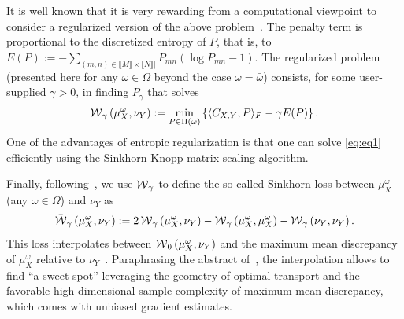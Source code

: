 It is well known  that it is very rewarding from  a computational viewpoint to
consider a  regularized version of the  above problem~\cite[Chapter~4]{COT19}.
The penalty term  is proportional to the discretized entropy  of $P$, that is,
to
$E(P)  :=   -  \sum_{(m,n)   \in  \llbracket  M\rrbracket   \times  \llbracket
  N\rrbracket]} P_{mn} (\log P_{mn}  -1)$.  The regularized problem (presented
here for  any $\omega  \in \Omega$  beyond the  case $\omega  = \bar{\omega}$)
consists, for  some user-supplied $\gamma  > 0$, in finding  $P_{\gamma}$ that
solves
\begin{equation}
  \label{eq:eq1}
  \operatorname{\mathcal{W}}_{\gamma}\left(\mu_X^{\omega}, \nu_Y \right) := \min_{P \in \Pi(\omega)}
  \left\{\langle C_{X,Y}, P \rangle_F - \gamma E(P)\right\}.  
\end{equation}
One  of the  advantages  of  entropic regularization  is  that  one can  solve
\eqref{eq:eq1} efficiently using the Sinkhorn-Knopp matrix scaling algorithm.

Finally, following~\cite{Genevay18}, we use  $\operatorname{\mathcal{W}}_{\gamma}$ to define the so
called Sinkhorn loss between $\mu_{X}^{\omega}$  (any $\omega \in \Omega$) and
$\nu_{Y}$ as
\begin{equation*}
  \bar{\operatorname{\mathcal{W}}}_{\gamma}\left(\mu_X^{\omega},        \nu_Y       \right)        :=       2
  \operatorname{\mathcal{W}}_{\gamma}\left(\mu_X^{\omega},         \nu_Y          \right)         -
  \operatorname{\mathcal{W}}_{\gamma}\left(\mu_X^{\omega},      \mu_X^{\omega}       \right)      -
  \operatorname{\mathcal{W}}_{\gamma}\left(\nu_Y, \nu_Y \right). 
\end{equation*}
This loss interpolates  between $\operatorname{\mathcal{W}}_{0}\left(\mu_X^{\omega}, \nu_Y \right)$
and   the   maximum  mean   discrepancy   of   $\mu_X^{\omega}$  relative   to
$\nu_Y$~\cite[Theorem~1]{Genevay18}.       Paraphrasing      the      abstract
of~\cite{Genevay18},  the  interpolation  allows  to  find  ``a  sweet  spot''
leveraging   the   geometry   of   optimal   transport   and   the   favorable
high-dimensional sample  complexity of  maximum mean discrepancy,  which comes
with unbiased gradient estimates.































